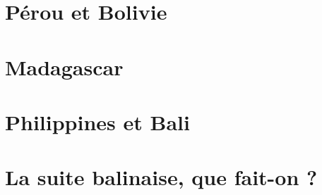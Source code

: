 \documentclass[a5paper, 10pt]{book}
\begin{document}
\begin{spacing}{1}
\chapter{Pérou et Bolivie}


\pagebreak
\pagebreak
\pagebreak

\chapter{Madagascar}

\pagebreak
\pagebreak
\pagebreak

\chapter{Philippines et Bali}

\pagebreak
\pagebreak
\pagebreak
\pagebreak

\chapter{La suite balinaise, que fait-on ?}



\end{spacing}
\backmatter
\end{document}
